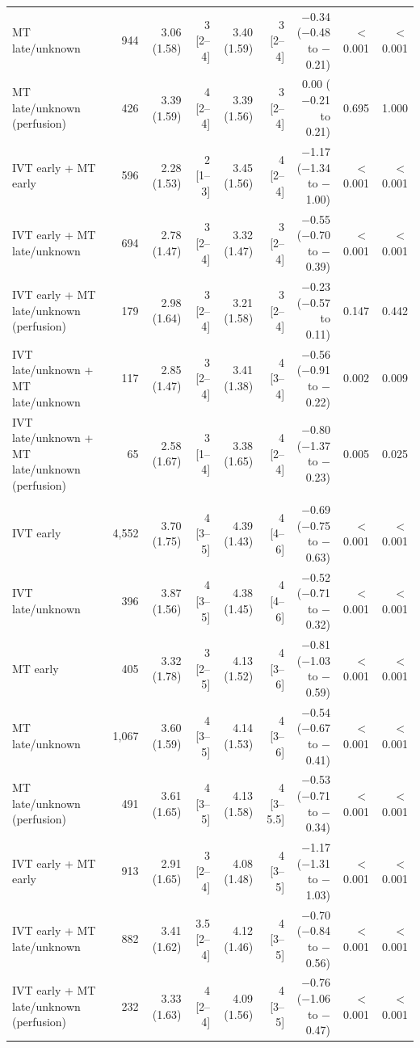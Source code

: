 \begin{landscape}
\begin{longtable}{p{5.6cm}rrrrrrrr}
MT late/unknown & 944 & 3.06 (1.58) & 3 [2--4] & 3.40 (1.59) & 3 [2--4] & $-$0.34 ($-$0.48 to $-$0.21) & $<$0.001 & $<$0.001 \\
MT late/unknown (perfusion) & 426 & 3.39 (1.59) & 4 [2--4] & 3.39 (1.56) & 3 [2--4] & 0.00 ($-$0.21 to 0.21) & 0.695 & 1.000 \\
IVT early + MT early & 596 & 2.28 (1.53) & 2 [1--3] & 3.45 (1.56) & 4 [2--4] & $-$1.17 ($-$1.34 to $-$1.00) & $<$0.001 & $<$0.001 \\
IVT early + MT late/unknown & 694 & 2.78 (1.47) & 3 [2--4] & 3.32 (1.47) & 3 [2--4] & $-$0.55 ($-$0.70 to $-$0.39) & $<$0.001 & $<$0.001 \\
IVT early + MT late/unknown (perfusion) & 179 & 2.98 (1.64) & 3 [2--4] & 3.21 (1.58) & 3 [2--4] & $-$0.23 ($-$0.57 to 0.11) & 0.147 & 0.442 \\
IVT late/unknown + MT late/unknown & 117 & 2.85 (1.47) & 3 [2--4] & 3.41 (1.38) & 4 [3--4] & $-$0.56 ($-$0.91 to $-$0.22) & 0.002 & 0.009 \\
IVT late/unknown + MT late/unknown (perfusion) & 65 & 2.58 (1.67) & 3 [1--4] & 3.38 (1.65) & 4 [2--4] & $-$0.80 ($-$1.37 to $-$0.23) & 0.005 & 0.025 \\
\addlinespace
\multicolumn{9}{l}{\textbf{NIHSS 16--20}}\\
IVT early & 4,552 & 3.70 (1.75) & 4 [3--5] & 4.39 (1.43) & 4 [4--6] & $-$0.69 ($-$0.75 to $-$0.63) & $<$0.001 & $<$0.001 \\
IVT late/unknown & 396 & 3.87 (1.56) & 4 [3--5] & 4.38 (1.45) & 4 [4--6] & $-$0.52 ($-$0.71 to $-$0.32) & $<$0.001 & $<$0.001 \\
MT early & 405 & 3.32 (1.78) & 3 [2--5] & 4.13 (1.52) & 4 [3--6] & $-$0.81 ($-$1.03 to $-$0.59) & $<$0.001 & $<$0.001 \\
MT late/unknown & 1,067 & 3.60 (1.59) & 4 [3--5] & 4.14 (1.53) & 4 [3--6] & $-$0.54 ($-$0.67 to $-$0.41) & $<$0.001 & $<$0.001 \\
MT late/unknown (perfusion) & 491 & 3.61 (1.65) & 4 [3--5] & 4.13 (1.58) & 4 [3--5.5] & $-$0.53 ($-$0.71 to $-$0.34) & $<$0.001 & $<$0.001 \\
IVT early + MT early & 913 & 2.91 (1.65) & 3 [2--4] & 4.08 (1.48) & 4 [3--5] & $-$1.17 ($-$1.31 to $-$1.03) & $<$0.001 & $<$0.001 \\
IVT early + MT late/unknown & 882 & 3.41 (1.62) & 3.5 [2--4] & 4.12 (1.46) & 4 [3--5] & $-$0.70 ($-$0.84 to $-$0.56) & $<$0.001 & $<$0.001 \\
IVT early + MT late/unknown (perfusion) & 232 & 3.33 (1.63) & 4 [2--4] & 4.09 (1.56) & 4 [3--5] & $-$0.76 ($-$1.06 to $-$0.47) & $<$0.001 & $<$0.001 \\

\end{longtable}
\end{landscape}
